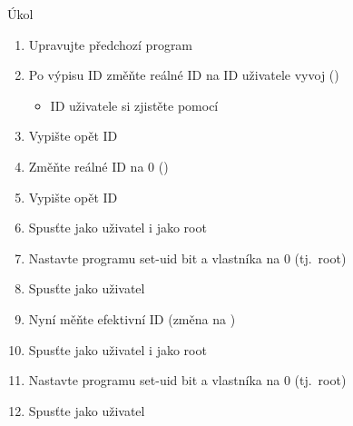 \begin{frame}{Úkol}

  \begin{enumerate}
    \item Upravujte předchozí program
    \item Po výpisu ID změňte reálné ID na ID uživatele vyvoj ()
    \begin{itemize}
      \item ID uživatele si zjistěte pomocí 
    \end{itemize}

    \item Vypište opět ID
    \item Změňte reálné ID na 0 ()
    \item Vypište opět ID
    \item Spusťte jako uživatel i jako root
    \item Nastavte programu set-uid bit a vlastníka na 0 (tj.\ root)
    \item Spusťte jako uživatel
    \item Nyní měňte efektivní ID (změna  na )
    \item Spusťte jako uživatel i jako root
    \item Nastavte programu set-uid bit a vlastníka na 0 (tj.\ root)
    \item Spusťte jako uživatel

  \end{enumerate}

\end{frame}
